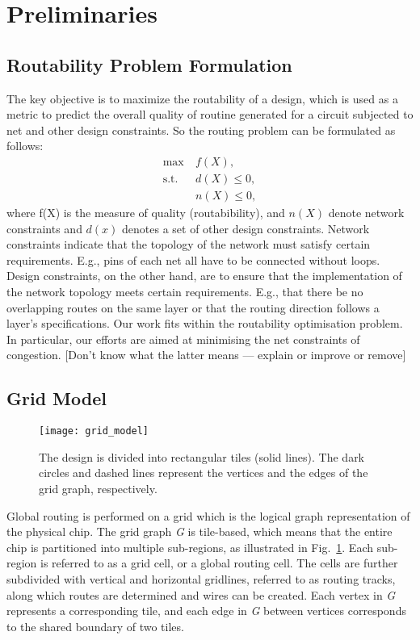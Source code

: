 \section{Preliminaries}
\label{sec:prelim}

\subsection{Routability Problem Formulation}
The key objective is to maximize the routability of a design, which is used as a metric to predict the overall quality of routine generated for a  circuit subjected to net and other design constraints.
So the routing problem can be formulated as follows:
\begin{subequations}
\begin{align*}
    \max  \       & f(X), \\
    \text{s.t.}~~ & d(X) \leq 0, \\
                  & n(X) \leq 0,
\end{align*}
\end{subequations}
where f(X) is the measure of quality (routabibility), and $n(X)$ denote network constraints and $d(x)$ denotes a set of other design constraints.  Network constraints indicate that the topology of the network must satisfy certain requirements.  E.g., pins of each net all have to be  connected without loops. Design constraints, on the other hand, are to ensure that the implementation of the network topology meets certain requirements. E.g., that there be no overlapping routes on the same layer or that the routing direction follows a layer's specifications. Our work fits within the routability optimisation problem. In particular, our efforts are aimed at minimising the net constraints of congestion. [Don't know what the latter means --- explain or improve or remove]

\subsection{Grid Model}
\label{subsec:grid model}

\begin{figure}[tb!]
    \centering
    \texttt{[image: grid\_model]}
	\caption{The design is divided into rectangular tiles (solid lines). The dark
		circles and dashed lines represent the vertices and the edges of the grid graph, respectively.}
	\label{fig:grid_model}
\end{figure}

Global routing is performed on a grid which is the logical graph representation of the physical chip. The grid graph \emph{G} is tile-based, which means that the entire chip is partitioned into multiple sub-regions, as illustrated in Fig.~\ref{fig:grid_model}. Each sub-region is referred to as a grid cell, or a global routing cell. The cells are further subdivided with vertical and horizontal gridlines, referred to as routing tracks, along which routes are determined and wires can be created. Each vertex in \emph{G} represents a corresponding tile, and each edge in \emph{G} between vertices corresponds to the shared boundary of two tiles.

